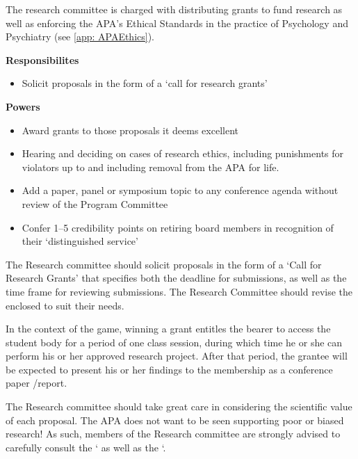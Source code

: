 \begin{refsection}
The research committee is charged with distributing grants to fund research as well as enforcing the APA's Ethical Standards in the practice of Psychology and Psychiatry (see \ref{app: APAEthics}).

\textbf{Responsibilites}

\begin{itemize}
\item Solicit proposals in the form of a `call for research grants'

\end{itemize}

\textbf{Powers} 

\begin{itemize}
\item Award grants to those proposals it deems excellent

\item Hearing and deciding on cases of research ethics, including punishments for violators up to and including removal from the APA for life.

\item Add a paper, panel or symposium topic to any conference agenda without review of the Program Committee

\item Confer 1--5 credibility points on retiring board members in recognition of their ‘distinguished service’

\end{itemize}

The Research committee should solicit proposals in the form of a `Call for Research Grants' that specifies both the deadline for submissions, as well as the time frame for reviewing submissions. The Research Committee should revise the enclosed  to suit their needs.

In the context of the game, winning a grant entitles the bearer to access the student body for a period of one class session, during which time he or she can perform his or her approved research project. After that period, the grantee will be expected to present his or her findings to the membership as a conference paper \slash  report.

The Research committee should take great care in considering the scientific value of each proposal. The APA does not want to be seen supporting poor or biased research! As such, members of the Research committee are strongly advised to carefully consult the ‘ as well as the ‘.


\end{refsection}
